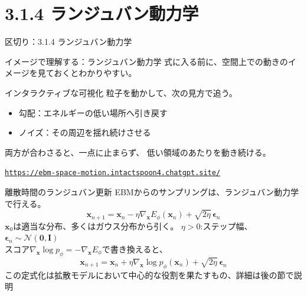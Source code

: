 \section{3.1.4 ランジュバン動力学}
\asmain
\begin{frame}{区切り：3.1.4 ランジュバン動力学}
    \tableofcontents[currentsection]
\end{frame}
\assuppl
\begin{frame}{イメージで理解する：ランジュバン動力学}
    式に入る前に、空間上での動きのイメージを見ておくとわかりやすい。
    \begin{exampleblock}{インタラクティブな可視化}
        粒子を動かして、次の見方で追う。
        \begin{itemize}
            \item 勾配：エネルギーの低い場所へ引き戻す
            \item ノイズ：その周辺を揺れ続けさせる
        \end{itemize}
        両方が合わさると、一点に止まらず、
        低い領域のあたりを動き続ける。
        \vspace{0.4em}
        \begin{center}
            \href{https://ebm-space-motion.intactspoon4.chatgpt.site/}
            {\small\texttt{https://ebm-space-motion.intactspoon4.chatgpt.site/}}
        \end{center}
    \end{exampleblock}
\end{frame}
\asmain
\begin{frame}{離散時間のランジュバン更新}
    EBMからのサンプリングは、ランジュバン動力学で行える。
    \[
        \bm{x}_{n+1}
        =
        \bm{x}_n
        -\eta\nabla_{\bm{x}}E_\phi(\bm{x}_n)
        +\sqrt{2\eta}\,\bm{\epsilon}_n
        \tag{3.1.4}
\]
    $\bm{x}_0$は適当な分布、多くはガウス分布から引く。
    $\eta>0$:ステップ幅、$\bm{\epsilon}_n\sim\mathcal{N}(\bm{0},\bm{I})$\\
    スコア$\nabla_{\bm{x}}\log p_\phi=-\nabla_{\bm{x}}E_\phi$で書き換えると、\\
    \[
        \bm{x}_{n+1}
        =
        \bm{x}_n
        +\eta\nabla_{\bm{x}}\log p_\phi(\bm{x}_n)
        +\sqrt{2\eta}\,\bm{\epsilon}_n
        \tag{3.1.5}
\]
この定式化は拡散モデルにおいて中心的な役割を果たすもの、詳細は後の節で説明
\end{frame}
\asmain
